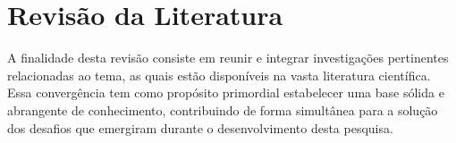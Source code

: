 \chapter{Revisão da Literatura}

A finalidade desta revisão consiste em reunir e integrar investigações pertinentes relacionadas ao tema, as quais estão disponíveis na vasta literatura científica. Essa convergência tem como propósito primordial estabelecer uma base sólida e abrangente de conhecimento, contribuindo de forma simultânea para a solução dos desafios que emergiram durante o desenvolvimento desta pesquisa.





